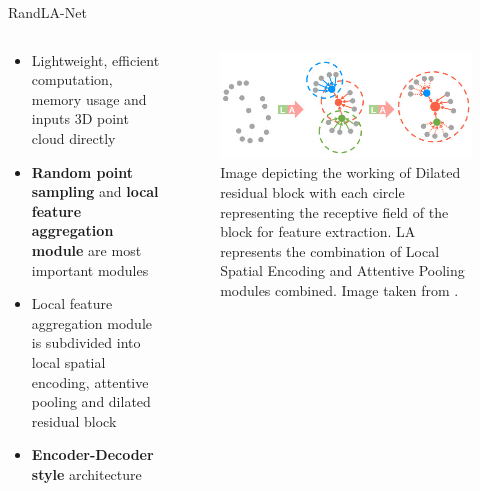 \documentclass[aspectratio=169]{beamer}
\begin{document}
\begin{frame}{RandLA-Net}
    \begin{columns}
        \begin{column}{0.6\textwidth}
            \begin{itemize}
                \item Lightweight, efficient computation, memory usage and inputs 3D point cloud directly
                \item \textbf{Random point sampling} and \textbf{local feature aggregation module} are most important modules
                \item Local feature aggregation module is subdivided into local spatial encoding, attentive pooling and dilated residual block
                \item \textbf{Encoder-Decoder style} architecture
            \end{itemize}
        \end{column}
        \begin{column}{0.4\textwidth}
            \begin{figure}
                \centering
                \includegraphics[scale=0.35]{images/randlanet_dires_effect.jpg}
                \caption{Image depicting the working of Dilated residual block with each circle representing the receptive
                field of the block for feature extraction. LA represents the combination of Local Spatial Encoding and
                Attentive Pooling modules combined. Image taken from \cite{Hu_2020_CVPR_Randla}.}
                \label{fig:dires_effect}
            \end{figure}
        \end{column}
    \end{columns}
    
\end{frame}
\end{document}

